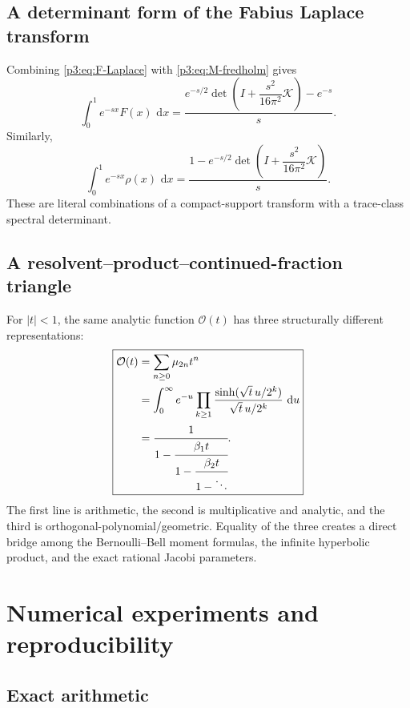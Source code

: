 \documentclass[11pt]{article}
\theoremstyle{definition}
\theoremstyle{remark}
\newcommand{\dd}{\,\mathrm d}
\newcommand{\cO}{\mathcal O}
\newcommand{\cK}{\mathcal K}
\begin{document}
\subsection{A determinant form of the Fabius Laplace transform}

Combining \eqref{p3:eq:F-Laplace} with \eqref{p3:eq:M-fredholm} gives
\begin{equation}
 \int_0^1e^{-sx}F(x)\,\dd x
 =\frac{e^{-s/2}
 \det\!\left(I+\dfrac{s^2}{16\pi^2}\cK\right)-e^{-s}}{s}.  \label{p3:eq:F-Laplace-determinant}
\end{equation}
Similarly,
\begin{equation}
 \int_0^1e^{-sx}\rho(x)\,\dd x
 =\frac{1-e^{-s/2}
 \det\!\left(I+\dfrac{s^2}{16\pi^2}\cK\right)}{s}.         \label{p3:eq:rho-half-determinant}
\end{equation}
These are literal combinations of a compact-support transform with a trace-class spectral
determinant.

\subsection{A resolvent--product--continued-fraction triangle}

For \(|t|<1\), the same analytic function \(\cO(t)\) has three structurally different
representations:
\begin{equation}
 \boxed{
 \begin{aligned}
 \cO(t)
 &=\sum_{n\ge0}\mu_{2n}t^n\\
 &=\int_0^{\infty}e^{-u}
   \prod_{k\ge1}\frac{\sinh(\sqrt t\,u/2^k)}{\sqrt t\,u/2^k}\,\dd u\\
 &=\cfrac{1}{1-\cfrac{\beta_1t}{1-\cfrac{\beta_2t}{1-\ddots}}}.
 \end{aligned}
 }                                                           \label{p3:eq:triangle}
\end{equation}
The first line is arithmetic, the second is multiplicative and analytic, and the third is
orthogonal-polynomial/geometric.  Equality of the three creates a direct bridge among the
Bernoulli--Bell moment formulas, the infinite hyperbolic product, and the exact rational
Jacobi parameters.

\section{Numerical experiments and reproducibility}

\subsection{Exact arithmetic}
\end{document}
